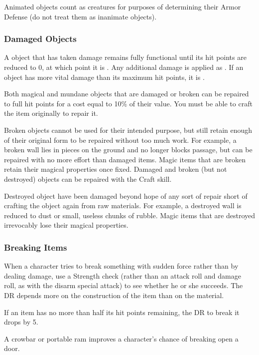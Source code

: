  Animated objects count as creatures for purposes of determining their Armor Defense (do not treat them as inanimate objects).


\subsubsection{Damaged Objects}
    A object that has taken damage remains fully functional until its hit points are reduced to 0, at which point it is .
    Any additional damage is applied as .
    If an object has more vital damage than its maximum hit points, it is .

    Both magical and mundane objects that are damaged or broken can be repaired to full hit points for a cost equal to 10\% of their value.
    You must be able to craft the item originally to repair it.

    \label{Broken Objects}
        Broken objects cannot be used for their intended purpose, but still retain enough of their original form to be repaired without too much work. For example, a broken wall lies in pieces on the ground and no longer blocks passage, but can be repaired with no more effort than damaged items. Magic items that are broken retain their magical properties once fixed. Damaged and broken (but not destroyed) objects can be repaired with the Craft skill.

    \label{Destroyed Objects}
        Destroyed object have been damaged beyond hope of any sort of repair short of crafting the object again from raw materials.
        For example, a destroyed wall is reduced to dust or small, useless chunks of rubble.
        Magic items that are destroyed irrevocably lose their magical properties.

\subsubsection{Breaking Items}
When a character tries to break something with sudden force rather than by dealing damage, use a Strength check (rather than an attack roll and damage roll, as with the disarm special attack) to see whether he or she succeeds. The DR depends more on the
construction of the item than on the material.

If an item has no more than half its hit points remaining, the DR to break it drops by 5.

A crowbar or portable ram improves a character's chance of breaking open a door.
